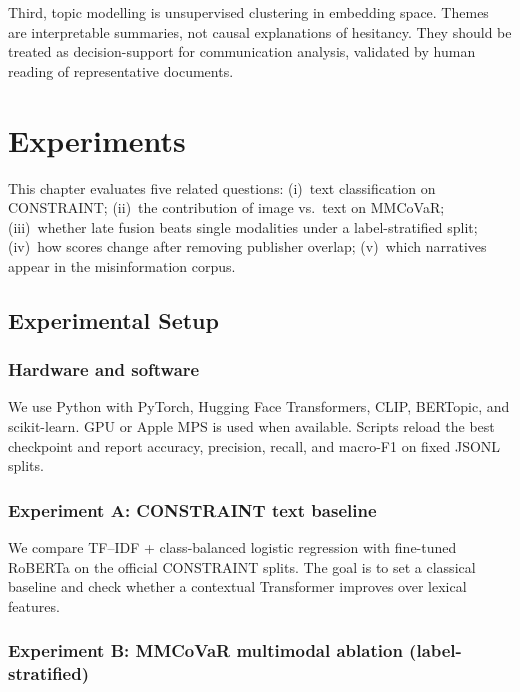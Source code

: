 \documentclass[12pt, a4paper]{report}
\begin{document}
Third, topic modelling is unsupervised clustering in embedding space.
Themes are interpretable summaries, not causal explanations of hesitancy.
They should be treated as decision-support for communication analysis, validated by human reading of representative documents.


\chapter{Experiments}
\label{chap:experiments}

This chapter evaluates five related questions:
(i)~text classification on CONSTRAINT;
(ii)~the contribution of image vs.\ text on MMCoVaR;
(iii)~whether late fusion beats single modalities under a label-stratified split;
(iv)~how scores change after removing publisher overlap;
(v)~which narratives appear in the misinformation corpus.

\section{Experimental Setup}
\label{sec:setup}

\subsection{Hardware and software}

We use Python with PyTorch, Hugging Face Transformers, CLIP, BERTopic, and scikit-learn.
GPU or Apple MPS is used when available.
Scripts reload the best checkpoint and report accuracy, precision, recall, and macro-F1 on fixed JSONL splits.

\subsection{Experiment A: CONSTRAINT text baseline}

We compare TF--IDF + class-balanced logistic regression with fine-tuned RoBERTa on the official CONSTRAINT splits.
The goal is to set a classical baseline and check whether a contextual Transformer improves over lexical features.

\subsection{Experiment B: MMCoVaR multimodal ablation (label-stratified)}
\end{document}
